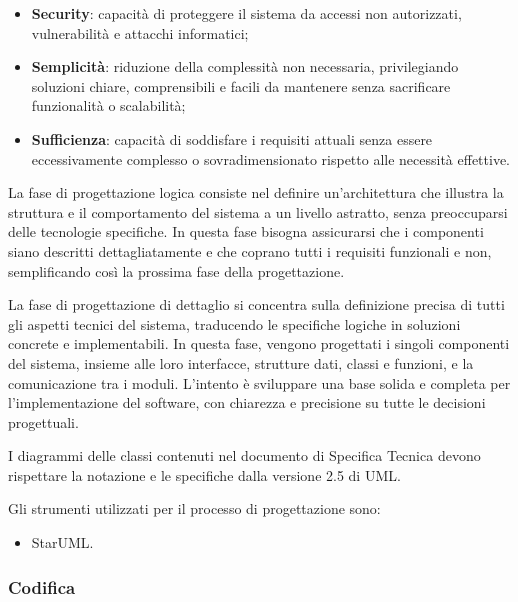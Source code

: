 \begin{itemize}
    \item \textbf{Security}: capacità di proteggere il sistema da accessi non autorizzati, vulnerabilità e attacchi informatici;
    \item \textbf{Semplicità}: riduzione della complessità non necessaria, privilegiando soluzioni chiare, comprensibili e facili da mantenere senza sacrificare funzionalità o scalabilità;
    \item \textbf{Sufficienza}: capacità di soddisfare i requisiti attuali senza essere eccessivamente complesso o sovradimensionato rispetto alle necessità effettive.
\end{itemize}

La fase di progettazione logica consiste nel definire un'architettura che illustra la struttura e il comportamento del sistema a un livello astratto, senza preoccuparsi delle tecnologie specifiche. In questa fase bisogna assicurarsi che i componenti siano descritti dettagliatamente e che coprano tutti i requisiti funzionali e non, semplificando così la prossima fase della progettazione.

La fase di progettazione di dettaglio si concentra sulla definizione precisa di tutti gli aspetti tecnici del sistema, traducendo le specifiche logiche in soluzioni concrete e implementabili. In questa fase, vengono progettati i singoli componenti del sistema, insieme alle loro interfacce, strutture dati, classi e funzioni, e la comunicazione tra i moduli. L'intento è sviluppare una base solida e completa per l'implementazione del software, con chiarezza e precisione su tutte le decisioni progettuali.

I diagrammi delle classi contenuti nel documento di Specifica Tecnica devono rispettare la notazione e le specifiche dalla versione 2.5 di UML.

Gli strumenti utilizzati per il processo di progettazione sono:
\begin{itemize}
    \item StarUML.
\end{itemize}

\subsubsection{Codifica}